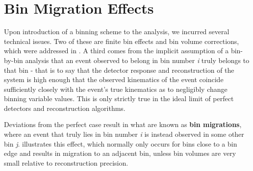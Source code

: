 \section{Bin Migration Effects}

Upon introduction of a binning scheme to the analysis, we incurred several technical issues. Two of these are finite bin effects and bin volume corrections, which were addressed in . A third comes from the implicit assumption of a bin-by-bin analysis that an event observed to belong in bin number \textit{i} truly belongs to that bin - that is to say that the detector response and reconstruction of the system is high enough that the observed kinematics of the event coincide sufficiently closely with the event's true kinematics as to negligibly change binning variable values. This is only strictly true in the ideal limit of perfect detectors and reconstruction algorithms.

Deviations from the perfect case result in what are known as \textbf{bin migrations}, where an event that truly lies in bin number \textit{i} is instead observed in some other bin \textit{j}.  illustrates this effect, which normally only occurs for bins close to a bin edge and results in migration to an adjacent bin, unless bin volumes are very small relative to reconstruction precision.  

